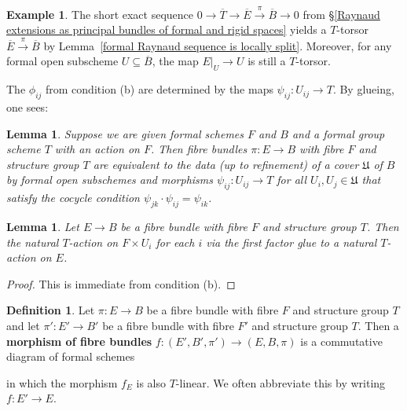 \documentclass[10pt,oneside]{amsart}
\newtheorem{lemma}[theorem]{Lemma}
\theoremstyle{definition}
\newtheorem{definition}[theorem]{Definition}
\newtheorem*{example}{Example}
\begin{document}
	\begin{example}
		The short exact sequence $0\rightarrow \overline{T}\rightarrow \overline{E}\xrightarrow{\pi} \overline{B}\rightarrow 0$ from \S\ref{Raynaud extensions as principal bundles of formal and rigid spaces} yields a $T$-torsor $\overline{E}\xrightarrow{\pi} \overline{B}$ by Lemma~\ref{formal Raynaud sequence is locally split}. Moreover, for any formal open subscheme $U\subseteq \overline{B}$, the map $E|_U\rightarrow U$ is still a $T$-torsor.
	\end{example}
	
	The $\phi_{ij}$ from condition (b) are determined by the maps $\psi_{ij}:U_{ij}\rightarrow T$. By glueing, one sees:
	\begin{lemma}\label{equivalent characterisation of principal $T$-bundle}
		Suppose we are given formal schemes $F$ and $B$ and a formal group scheme $T$ with an action on $F$. Then fibre bundles $\pi:E\rightarrow B$ with fibre $F$ and structure group $T$ are equivalent to the data (up to refinement) of a cover $\mathfrak U$ of $B$ by formal open subschemes and morphisms $\psi_{ij}:U_{ij}\rightarrow T$ for all $U_i,U_j\in \mathfrak U$ that satisfy the cocycle condition $\psi_{jk}\cdot \psi_{ij}=\psi_{ik}$.
	\end{lemma}
	\begin{lemma}
		Let $E\rightarrow B$ be a fibre bundle with fibre $F$ and structure group $T$. Then the natural $T$-action on $F\times U_{i}$ for each $i$ via the first factor glue to a natural $T$-action on $E$.
	\end{lemma}
	\begin{proof}
		This is immediate from condition (b).
	\end{proof}
	\begin{definition}
		Let $\pi:E\rightarrow B$ be a fibre bundle with fibre $F$ and structure group $T$ and let $\pi':E'\rightarrow B'$ be a fibre bundle with fibre $F'$ and structure group $T$. Then a \textbf{morphism of fibre bundles} $f:(E',B',\pi')\rightarrow (E,B,\pi)$ is a commutative diagram of formal schemes
		\begin{center}
		\end{center}
		in which the morphism $f_E$ is also $T$-linear. We often abbreviate this by writing $f:E'\rightarrow E$.
	\end{definition}
	
\end{document}
